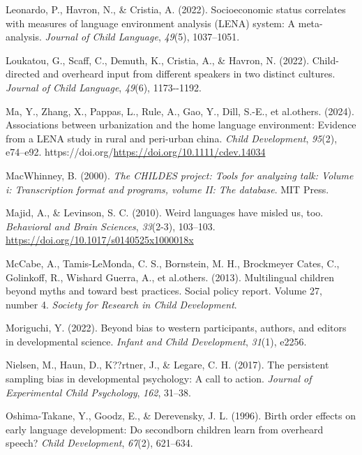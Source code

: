 \documentclass[
  man,floatsintext]{apa6}
\newlength{\cslhangindent}
\newenvironment{CSLReferences}[2] %
 {\begin{list}{}{%
  \setlength{\itemindent}{0pt}
  \setlength{\leftmargin}{0pt}
  \setlength{\parsep}{0pt}
  \ifodd #1
   \setlength{\leftmargin}{\cslhangindent}
   \setlength{\itemindent}{-1\cslhangindent}
  \fi
  \setlength{\itemsep}{#2\baselineskip}}}
 {\end{list}}
\begin{document}
\begin{CSLReferences}{1}{0}
Leonardo, P., Havron, N., \& Cristia, A. (2022). Socioeconomic status correlates with measures of language environment analysis (LENA) system: A meta-analysis. \emph{Journal of Child Language}, \emph{49}(5), 1037--1051.

Loukatou, G., Scaff, C., Demuth, K., Cristia, A., \& Havron, N. (2022). Child-directed and overheard input from different speakers in two distinct cultures. \emph{Journal of Child Language}, \emph{49}(6), 1173-\/-1192.

Ma, Y., Zhang, X., Pappas, L., Rule, A., Gao, Y., Dill, S.-E., et al.others. (2024). Associations between urbanization and the home language environment: Evidence from a LENA study in rural and peri-urban china. \emph{Child Development}, \emph{95}(2), e74--e92. https://doi.org/\url{https://doi.org/10.1111/cdev.14034}

MacWhinney, B. (2000). \emph{The CHILDES project: Tools for analyzing talk: Volume i: Transcription format and programs, volume II: The database}. MIT Press.

Majid, A., \& Levinson, S. C. (2010). Weird languages have misled us, too. \emph{Behavioral and Brain Sciences}, \emph{33}(2-3), 103--103. \url{https://doi.org/10.1017/s0140525x1000018x}

McCabe, A., Tamis-LeMonda, C. S., Bornstein, M. H., Brockmeyer Cates, C., Golinkoff, R., Wishard Guerra, A., et al.others. (2013). Multilingual children beyond myths and toward best practices. Social policy report. Volume 27, number 4. \emph{Society for Research in Child Development}.

Moriguchi, Y. (2022). Beyond bias to western participants, authors, and editors in developmental science. \emph{Infant and Child Development}, \emph{31}(1), e2256.

Nielsen, M., Haun, D., K??rtner, J., \& Legare, C. H. (2017). The persistent sampling bias in developmental psychology: A call to action. \emph{Journal of Experimental Child Psychology}, \emph{162}, 31--38.

Oshima-Takane, Y., Goodz, E., \& Derevensky, J. L. (1996). Birth order effects on early language development: Do secondborn children learn from overheard speech? \emph{Child Development}, \emph{67}(2), 621--634.


\end{CSLReferences}
\end{document}
